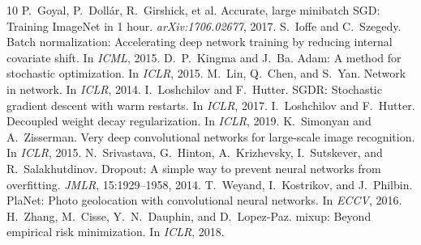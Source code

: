 \documentclass[11pt,a4paper]{article}
\begin{document}
\begin{thebibliography}{10}\small
{} P.~Goyal, P.~Doll\'ar, R.~Girshick, et al. Accurate, large minibatch SGD: Training ImageNet in 1 hour. \emph{arXiv:1706.02677}, 2017.
 S.~Ioffe and C.~Szegedy. Batch normalization: Accelerating deep network training by reducing internal covariate shift. In \emph{ICML}, 2015.
 D.~P.~Kingma and J.~Ba. Adam: A method for stochastic optimization. In \emph{ICLR}, 2015.
 M.~Lin, Q.~Chen, and S.~Yan. Network in network. In \emph{ICLR}, 2014.
 I.~Loshchilov and F.~Hutter. SGDR: Stochastic gradient descent with warm restarts. In \emph{ICLR}, 2017.
 I.~Loshchilov and F.~Hutter. Decoupled weight decay regularization. In \emph{ICLR}, 2019.
 K.~Simonyan and A.~Zisserman. Very deep convolutional networks for large-scale image recognition. In \emph{ICLR}, 2015.
 N.~Srivastava, G.~Hinton, A.~Krizhevsky, I.~Sutskever, and R.~Salakhutdinov. Dropout: A simple way to prevent neural networks from overfitting. \emph{JMLR}, 15:1929--1958, 2014.
 T.~Weyand, I.~Kostrikov, and J.~Philbin. PlaNet: Photo geolocation with convolutional neural networks. In \emph{ECCV}, 2016.
 H.~Zhang, M.~Cisse, Y.~N.~Dauphin, and D.~Lopez-Paz. mixup: Beyond empirical risk minimization. In \emph{ICLR}, 2018.
\end{thebibliography}
\end{document}
